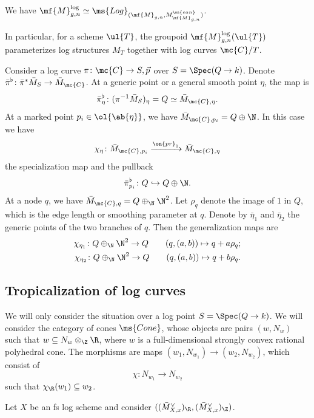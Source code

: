 \begin{prop}
    We have \(\mf{M}_{g,n}^{\log} \simeq \ms{Log}_{(\mf{M}_{g,n}, M_{\mf{M}_{g,n}}^{\on{can}})}\).
\end{prop}

In particular, for a scheme \(\ul{T}\), the groupoid \(\mf{M}_{g,n}^{\log}(\ul{T})\) parameterizes log structures \(M_T\) together with log curves \(\mc{C} / T\).

Consider a log curve \(\pi \colon \mc{C} \to S, \vec{p}\) over \(S = \Spec (Q \to k)\). Denote \(\bar{\pi}^{\flat} \colon \bar{\pi}^* \bar{M}_S \to \bar{M}_{\mc{C}}\). At a generic point or a general smooth point \(\eta\), the map is
\[ \bar{\pi}_{\eta}^{\flat} \colon (\pi^{-1} \bar{M}_S)_{\eta} = Q \simeq \bar{M}_{\mc{C}, \eta}. \]
At a marked point \(p_i \in \ol{\ab\{\eta\}}\), we have \(\bar{M}_{\mc{C}, p_i} = Q \oplus \N\). In this case we have
\[ \chi_{\eta} \colon \bar{M}_{\mc{C}, p_i} \xrightarrow{\on{pr}_1} \bar{M}_{\mc{C}, \eta} \]
the specialization map and the pullback
\[ \bar{\pi}_{p_i}^{\flat} \colon Q \hookrightarrow Q \oplus \N. \]
At a node \(q\), we have \(\bar{M}_{\mc{C}, q} = Q \oplus_{\N} \N^2\). Let \(\rho_q\) denote the image of \(1\) in \(Q\), which is the edge length or smoothing parameter at \(q\). Denote by \(\bar{\eta}_1\) and \(\bar{\eta}_2\) the generic points of the two branches of \(q\). Then the generalization maps are
\begin{align*}
    \chi_{\eta_1} \colon Q \oplus_{\N} \N^2 \to Q \qquad (q, (a,b)) \mapsto q + a \rho_q ;\\
    \chi_{\eta_2} \colon Q \oplus_{\N} \N^2 \to Q \qquad (q, (a,b)) \mapsto q + b \rho_q .
\end{align*}

\subsection{Tropicalization of log curves}%
\label{sub:Tropicalization of log curves}

We will only consider the situation over a log point \(S = \Spec(Q \to k)\). We will consider the category of cones \(\ms{Cone}\), whose objects are pairs \((w, N_w)\) such that \(w \subseteq N_w \otimes_{\Z} \R\), where \(w\) is a full-dimensional strongly convex rational polyhedral cone. The morphisms are maps \((w_1, N_{w_1}) \to (w_2, N_{w_2})\), which consist of
\[ \chi \colon N_{w_1} \to N_{w_2} \]
such that \(\chi_{\R}(w_1) \subseteq w_2\). 

\begin{exm}
    Let \(X\) be an fs log scheme and consider \(( (\bar{M}_{X,x}^{\vee})_{\R}, (\bar{M}_{X,x}^{\vee})_{\Z} )\).
\end{exm}

